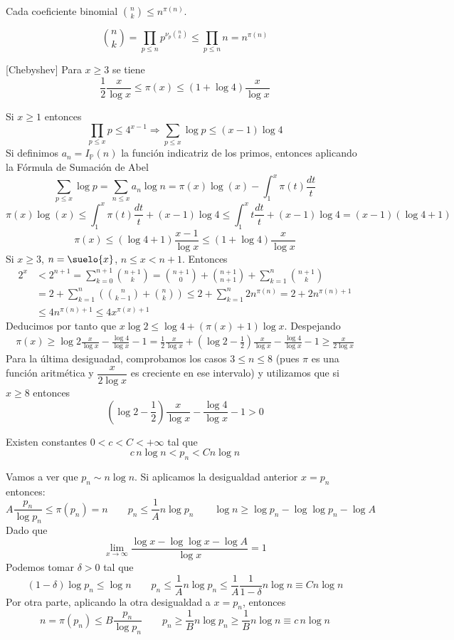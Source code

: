 \documentclass[TAN.tex]{subfiles}
\begin{document}
\begin{coro}
Cada coeficiente binomial $\binom{n}{k} ≤ n^{π(n)}$.
\end{coro}
\begin{dem}
\[ \binom{n}{k} = \prod_{p≤n} p^{\nu_p\binom{n}{k}} ≤ \prod_{p≤n} n = n^{π(n)} \]
\end{dem}
\begin{teorema}\label{th:1.2.6}[Chebyshev] Para $x\geq 3$ se tiene
$$
\frac{1}{2}\frac{x}{\log x}\leq \pi(x)\leq (1+\log 4)\frac{x}{\log x}
$$
\end{teorema}
\begin{dem}
Si $x\geq 1$ entonces 
$$\prod_{p\leq x}p\leq 4^{x-1} \Rightarrow \sum_{p\leq x} \log p \leq (x-1) \log 4$$
Si definimos $a_n=I_{\mathbb{P}}(n)$ la función indicatriz de los primos, entonces aplicando la Fórmula de Sumación de Abel
$$\sum_{p\leq x} \log p = \sum_{n\leq x}a_n \log n = \pi(x)\log(x)-\int_1^x \pi(t)\frac{dt}{t}$$
$$\pi(x)\log(x) \leq \int_1^x \pi(t)\frac{dt}{t} + (x-1)\log 4
\leq \int_1^x t\frac{dt}{t} + (x-1)\log4 = (x-1)(\log4 +1)$$
$$ \pi(x)\leq (\log 4 +1) \frac{x-1}{\log x}\leq (1+\log 4)\frac{x}{\log x}$$
Si $x\geq 3$, $n=\suelo{ x }$, $n\leq x < n+1$. Entonces
\begin{align*}
2^x &< 2^{n+1} = \sum_{k=0}^{n+1}\binom{n+1}{k} = \binom{n+1}{0}+\binom{n+1}{n+1} + \sum_{k=1}^n \binom{n+1}{k}\\
&= 2 +  \sum_{k=1}^n \left(\binom{n}{k-1}+\binom{n}{k}\right) \leq 2 + \sum_{k=1}^n 2n^{\pi(n)} = 2+2n^{\pi(n)+1} \\
&\leq 4n^{\pi(n)+1}\leq 4x^{\pi(x)+1}
\end{align*}
Deducimos por tanto que $x \log 2\leq \log 4 + (\pi(x)+1)\log x$. Despejando	
\begin{align*}
 \pi(x) \geq \log 2 \frac{x}{\log x} -\frac{\log 4}{\log x}-1 = \frac{1}{2}\frac{x}{\log x} +  \left(\log 2 - \frac{1}{2}\right)\frac{x}{\log x} - \frac{\log4}{\log x}-1 \geq \frac{x}{2\log{x}}
\end{align*}
Para la última desiguadad, comprobamos los casos $3\leq n \leq 8$ (pues $\pi$ es una función aritmética y $\dfrac{x}{2\log{x}}$ es creciente en ese intervalo) y utilizamos que si $x\geq 8$ entonces
$$
 \left(\log 2 - \frac{1}{2}\right)\frac{x}{\log x} - \frac{\log4}{\log x}-1 > 0
$$
\end{dem}
\begin{coro}
Existen constantes $0<c<C<+∞$ tal que
\[{c}\,{n} \log n < p_n < C n \log n \]
\end{coro}
\begin{dem}
Vamos a ver que $p_n \sim n \log n$. Si aplicamos la desigualdad anterior $x=p_n$ entonces:
$$
A\frac{p_n}{\log p_n} \leq \pi(p_n) = n \qquad  p_n \leq \frac{1}{A}n\log p_n \qquad \log n \geq \log p_n - \log \log p_n - \log A
$$
Dado que
$$
\lim_{x\to\infty}\frac{\log x-\log\log x-\log A}{\log x}= 1
$$
Podemos tomar $\delta >0$ tal que
$$
(1-\delta)\log p_n \leq \log n \qquad p_n \leq \frac{1}{A}n\log p_n\leq \frac{1}{A}\frac{1}{1-\delta}n \log n\equiv C n \log n$$
Por otra parte, aplicando la otra desigualdad a $x=p_n$, entonces
$$n=\pi(p_n) \leq B \dfrac{p_n}{\log p_n} \qquad p_n \geq \frac{1}{B}n\log p_n \geq \frac{1}{B}n \log n\equiv c\,n\log n$$
\end{dem}
\end{document}
